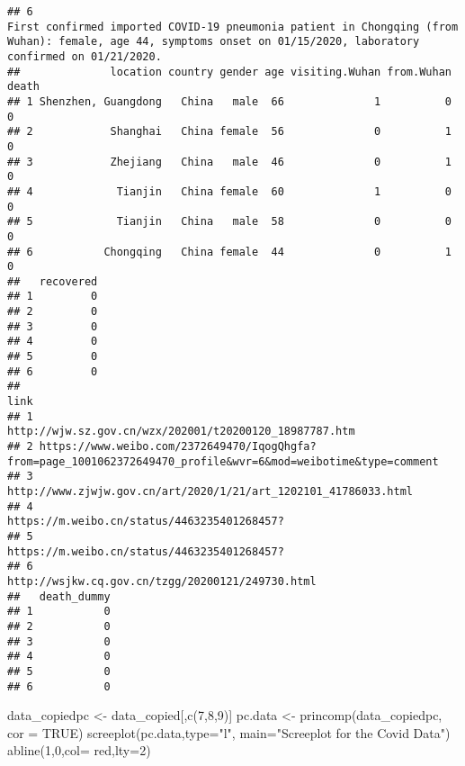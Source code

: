\documentclass[
]{article}
\newenvironment{Shaded}{\begin{snugshade}}{\end{snugshade}}
\newcommand{\AttributeTok}[1]{\textcolor[rgb]{0.77,0.63,0.00}{#1}}
\newcommand{\ConstantTok}[1]{\textcolor[rgb]{0.00,0.00,0.00}{#1}}
\newcommand{\DecValTok}[1]{\textcolor[rgb]{0.00,0.00,0.81}{#1}}
\newcommand{\FunctionTok}[1]{\textcolor[rgb]{0.00,0.00,0.00}{#1}}
\newcommand{\NormalTok}[1]{#1}
\newcommand{\OtherTok}[1]{\textcolor[rgb]{0.56,0.35,0.01}{#1}}
\newcommand{\StringTok}[1]{\textcolor[rgb]{0.31,0.60,0.02}{#1}}
\begin{document}
\begin{verbatim}
## 6                                                                                                                                                                                                                                                     First confirmed imported COVID-19 pneumonia patient in Chongqing (from Wuhan): female, age 44, symptoms onset on 01/15/2020, laboratory confirmed on 01/21/2020.
##              location country gender age visiting.Wuhan from.Wuhan death
## 1 Shenzhen, Guangdong   China   male  66              1          0     0
## 2            Shanghai   China female  56              0          1     0
## 3            Zhejiang   China   male  46              0          1     0
## 4             Tianjin   China female  60              1          0     0
## 5             Tianjin   China   male  58              0          0     0
## 6           Chongqing   China female  44              0          1     0
##   recovered
## 1         0
## 2         0
## 3         0
## 4         0
## 5         0
## 6         0
##                                                                                                             link
## 1                                                         http://wjw.sz.gov.cn/wzx/202001/t20200120_18987787.htm
## 2 https://www.weibo.com/2372649470/IqogQhgfa?from=page_1001062372649470_profile&wvr=6&mod=weibotime&type=comment
## 3                                                http://www.zjwjw.gov.cn/art/2020/1/21/art_1202101_41786033.html
## 4                                                                    https://m.weibo.cn/status/4463235401268457?
## 5                                                                    https://m.weibo.cn/status/4463235401268457?
## 6                                                               http://wsjkw.cq.gov.cn/tzgg/20200121/249730.html
##   death_dummy
## 1           0
## 2           0
## 3           0
## 4           0
## 5           0
## 6           0
\end{verbatim}

\begin{Shaded}
\begin{Highlighting}[]
\NormalTok{data\_copiedpc }\OtherTok{\textless{}{-}}\NormalTok{ data\_copied[,}\FunctionTok{c}\NormalTok{(}\DecValTok{7}\NormalTok{,}\DecValTok{8}\NormalTok{,}\DecValTok{9}\NormalTok{)]}
\NormalTok{pc.data }\OtherTok{\textless{}{-}} \FunctionTok{princomp}\NormalTok{(data\_copiedpc, }\AttributeTok{cor =} \ConstantTok{TRUE}\NormalTok{)}
\FunctionTok{screeplot}\NormalTok{(pc.data,}\AttributeTok{type=}\StringTok{"l"}\NormalTok{, }\AttributeTok{main=}\StringTok{"Screeplot for the Covid Data"}\NormalTok{)}
\FunctionTok{abline}\NormalTok{(}\DecValTok{1}\NormalTok{,}\DecValTok{0}\NormalTok{,}\AttributeTok{col=} \StringTok{\textquotesingle{}red\textquotesingle{}}\NormalTok{,}\AttributeTok{lty=}\DecValTok{2}\NormalTok{)}
\end{Highlighting}
\end{Shaded}
\end{document}
